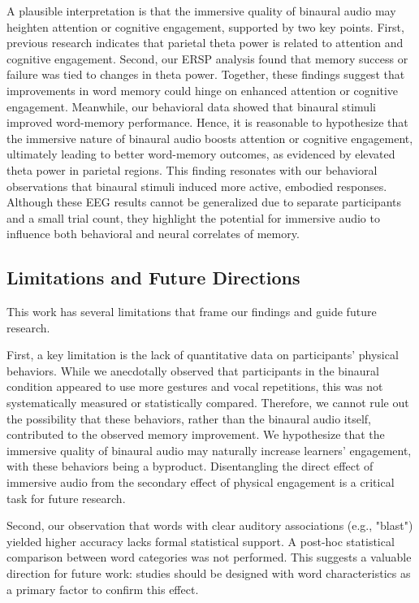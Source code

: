 \documentclass{ehissymp}
\begin{document}
A plausible interpretation is that the immersive quality of binaural audio may heighten attention or cognitive engagement, supported by two key points. First, previous research indicates that parietal theta power is related to attention and cognitive engagement. Second, our ERSP analysis found that memory success or failure was tied to changes in theta power. Together, these findings suggest that improvements in word memory could hinge on enhanced attention or cognitive engagement. Meanwhile, our behavioral data showed that binaural stimuli improved word-memory performance. Hence, it is reasonable to hypothesize that the immersive nature of binaural audio boosts attention or cognitive engagement, ultimately leading to better word-memory outcomes, as evidenced by elevated theta power in parietal regions. This finding resonates with our behavioral observations that binaural stimuli induced more active, embodied responses. Although these EEG results cannot be generalized due to separate participants and a small trial count, they highlight the potential for immersive audio to influence both behavioral and neural correlates of memory.


\subsection{Limitations and Future Directions}
This work has several limitations that frame our findings and guide future research.

First, a key limitation is the lack of quantitative data on participants' physical behaviors. While we anecdotally observed that participants in the binaural condition appeared to use more gestures and vocal repetitions, this was not systematically measured or statistically compared. Therefore, we cannot rule out the possibility that these behaviors, rather than the binaural audio itself, contributed to the observed memory improvement. We hypothesize that the immersive quality of binaural audio may naturally increase learners' engagement, with these behaviors being a byproduct. Disentangling the direct effect of immersive audio from the secondary effect of physical engagement is a critical task for future research.

Second, our observation that words with clear auditory associations (e.g., "blast") yielded higher accuracy lacks formal statistical support. A post-hoc statistical comparison between word categories was not performed. This suggests a valuable direction for future work: studies should be designed with word characteristics as a primary factor to confirm this effect.
\end{document}
